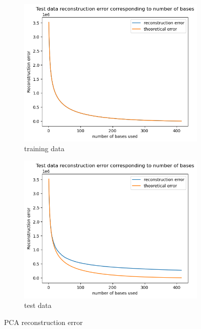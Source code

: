 \begin{figure}
	\centering
	\begin{subfigure}[t]{0.48\linewidth}
		\centering
		\includegraphics[width=\linewidth]{image/q1_recon_error_train.png}
		\caption{training data}
		\label{fig:recon_error_train}
	\end{subfigure}%
	\hfill
	\begin{subfigure}[t]{0.48\linewidth}
		\centering
		\includegraphics[width=\linewidth]{image/q1_recon_error_test.png}
		\caption{test data}
		\label{fig:recon_error_test}
	\end{subfigure}
	\caption{PCA reconstruction error}
	\label{fig:recon_error}
\end{figure}

